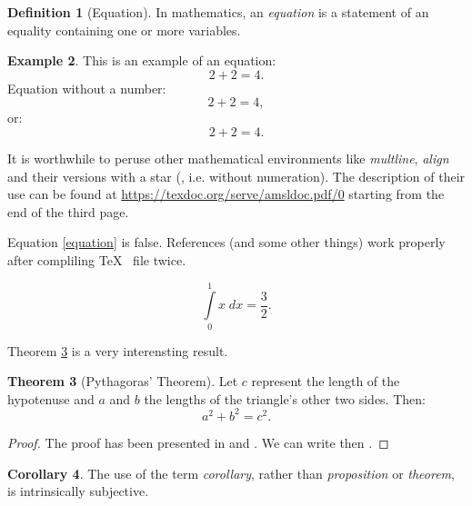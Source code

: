 \documentclass[a4paper,11pt,twoside]{report}
\theoremstyle{definition}
\newtheorem{theorem}{Theorem}[chapter]
\newtheorem{example}[theorem]{Example}
\newtheorem{corollary}[theorem]{Corollary}
\newtheorem{definition}[theorem]{Definition}
\begin{document}
\begin{definition}[Equation]
    In mathematics, an \emph{equation} is a statement of an equality containing one or more variables.
\end{definition}
%
\begin{example}
    This is an example of an equation:
    \begin{equation}
        2+2=4.
    \end{equation}
    Equation without a number:
    \begin{equation*}
        2+2=4,
    \end{equation*}
    or:
    \[
        2+2=4.
    \]

    It is worthwhile to peruse other mathematical environments like  \emph{multline}, \emph{align} and their versions with a star (, i.e. without numeration). The description of their use can be found at  \url{https://texdoc.org/serve/amsldoc.pdf/0} starting from the end of the third page.

    Equation \eqref{equation} is false. References (and some other things) work properly after compliling \TeX ~ file twice.

    \begin{equation}\label{equation}
        \int \limits_{0}^{1} x \; dx = \frac{3}{2}.
    \end{equation}

\end{example}

Theorem \ref{Pitagoras} is a very interensting result.

\begin{theorem}[Pythagoras' Theorem]\label{Pitagoras}
    Let $c$ represent the length of the hypotenuse and $a$ and $b$ the lengths of the triangle's other two sides. Then:
    \begin{equation*}
        a^2 + b^2 = c^2.
    \end{equation*}
\end{theorem}

\begin{proof}
    The proof has been presented in \cite{Ktos} and \cite{Innyktos}. We can write then \cite{Ktos, Innyktos}.
\end{proof}

\begin{corollary}
    The use of the term \emph{corollary}, rather than \emph{proposition} or \emph{theorem}, is intrinsically subjective.
\end{corollary}
\end{document}
